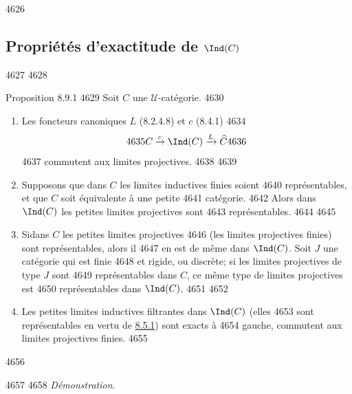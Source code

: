   4626	\subsection{Propriétés d'exactitude de $\Ind(C)$}
  4627	
  4628	\begin{enonce*}{Proposition 8.9.1}
  4629	Soit $C$ une $𝒰$-catégorie.
  4630	\begin{enumerate}
  4631	\renewcommand{\theenumi}{\alph{enumi}}
  4632	\renewcommand{\labelenumi}{\theenumi)}
  4633	\item Les foncteurs canoniques $L$ (8.2.4.8) et $c$ (8.4.1)
  4634	$$
  4635	C\xrightarrow{c}\Ind(C)\xrightarrow{L}\widehat{C}
  4636	$$
  4637	commutent aux limites projectives.
  4638	
  4639	\item Supposons que dans $C$ les limites inductives finies soient
  4640	représentables, et que $C$ soit équivalente à une petite
  4641	catégorie.
  4642	Alors dans $\Ind(C)$ les petites limites projectives sont
  4643	représentables.
  4644	
  4645	\item Si\pageoriginale dans $C$ les petites limites projectives
  4646	(\resp les limites projectives finies) sont représentables, alors il
  4647	en est de même dans $\Ind(C)$. Soit $J$ une catégorie qui est finie
  4648	et rigide, ou discrète; si les limites projectives de type $J$ sont
  4649	représentables dans $C$, ce même type de limites projectives est
  4650	représentables dans $\Ind(C)$.
  4651	
  4652	\item Les petites limites inductives filtrantes dans $\Ind(C)$ (elles
  4653	sont représentables en vertu de \hyperref[I.prop8.5.1]{8.5.1}) sont exacts à
  4654	gauche, \ie commutent aux limites projectives finies.
  4655	\end{enumerate}
  4656	\end{enonce*}
  4657	
  4658	\noindent \emph{Démonstration}.
